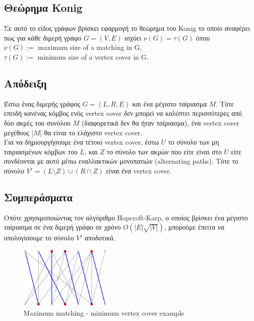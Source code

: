 \subsection{Θεώρημα Konig}

Σε αυτό το είδος γράφων βρίσκει εφαρμογή το θεώρημα του Konig το οποίο αναφέρει πως για κάθε διμερή γράφο $G=(V,E)$ ισχύει $\nu(G) = \tau(G)$ όπου\\
$\nu(G) := $ maximum size of a matching in G,\\
$\tau(G) := $ minimum size of a vertex cover in G.

\subsection{Απόδειξη}
\justify
Έστω ένας διμερής γράφος $G = (L, R, E)$ και ένα μέγιστο ταίριασμα $M$. Τότε επειδή κανένας κόμβος ενός vertex cover δεν μπορεί να καλύπτει περισσότερες από δύο ακμές του συνόλου $M$ (διαφορετικά δεν θα ήταν ταίριασμα), ένα vertex cover μεγέθους $|M|$ θα είναι το ελάχιστο vertex cover.\\
Για να δημιουργήσουμε ένα τέτοιο vertex cover, έστω $U$ το σύνολο των μη ταιριασμένων κόμβων του $L$, και $Z$ το σύνολο των ακμών που είτε είναι στο $U$ είτε συνδέονται με αυτό μέσω εναλλακτικών μονοπατιών (alternating paths). Τότε το σύνολο $V' = (L \setminus Z) \cup (R \cap Z)$ είναι ένα vertex cover. 

\subsection{Συμπεράσματα}

Οπότε χρησιμοποιώντας τον αλγόριθμο Hopcroft-Karp, ο οποίος βρίσκει ένα μέγιστο ταίριασμα σε ένα διμερή γράφο σε χρόνο $O(|E| \sqrt{|V|})$, μπορούμε έπειτα να υπολογίσουμε το σύνολο $V'$ αποδοτικά.

\begin{figure}[H]
\caption{Maximum matching - minimum vertex cover example}
\centering
\includegraphics[width=0.4\textwidth]{Figures/KonigTheo.png}\centering
\end{figure}

